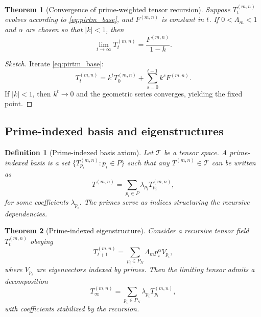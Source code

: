 \documentclass[11pt]{article}
\newtheorem{theorem}{Theorem}
\newtheorem{definition}{Definition}
\begin{document}
\begin{theorem}[Convergence of prime-weighted tensor recursion]
Suppose $T^{(m,n)}_t$ evolves according to \eqref{eq:pirtm_base}, and $F^{(m,n)}$ is constant in $t$. If $0 < \Lambda_m < 1$ and $\alpha$ are chosen so that $|k| < 1$, then
\begin{equation}
  \lim_{t \to \infty} T^{(m,n)}_t
  =
  \frac{F^{(m,n)}}{1 - k}.
\end{equation}
\end{theorem}

\begin{proof}[Sketch]
Iterate \eqref{eq:pirtm_base}:
\begin{equation}
  T_{t}^{(m,n)}
  =
  k^t T_0^{(m,n)}
  +
  \sum_{s=0}^{t-1} k^s F^{(m,n)}.
\end{equation}
If $|k|<1$, then $k^t \to 0$ and the geometric series converges, yielding the fixed point.
\end{proof}

\subsection{Prime-indexed basis and eigenstructures}

\begin{definition}[Prime-indexed basis axiom]
Let $\mathcal{T}$ be a tensor space. A \emph{prime-indexed basis} is a set $\{T_{p_i}^{(m,n)} : p_i \in P\}$ such that any $T^{(m,n)} \in \mathcal{T}$ can be written as
\begin{equation}
  T^{(m,n)}
  =
  \sum_{p_i \in P} \lambda_{p_i} T_{p_i}^{(m,n)},
\end{equation}
for some coefficients $\lambda_{p_i}$. The primes serve as indices structuring the recursive dependencies.
\end{definition}

\begin{theorem}[Prime-indexed eigenstructure]
Consider a recursive tensor field $T^{(m,n)}_t$ obeying
\begin{equation}
  T^{(m,n)}_{t+1}
  =
  \sum_{p_i \in P_N} \Lambda_m p_i^{\alpha} V_{p_i},
\end{equation}
where $V_{p_i}$ are eigenvectors indexed by primes. Then the limiting tensor admits a decomposition
\begin{equation}
  T^{(m,n)}_{\infty}
  =
  \sum_{p_i \in P_N} \lambda_{p_i} T_{p_i}^{(m,n)},
\end{equation}
with coefficients stabilized by the recursion.
\end{theorem}
\end{document}
